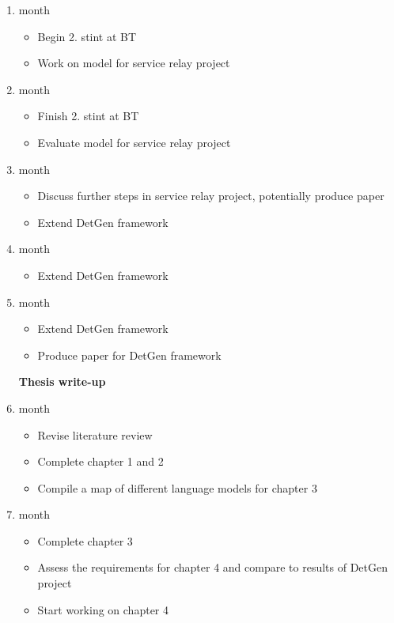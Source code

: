 \documentclass[a4paper,12pt,twoside]{article}
\begin{document}
\begin{enumerate}
\item month
\begin{itemize}
\item Begin 2. stint at BT
\item Work on model for service relay project
\end{itemize}

\item month
\begin{itemize}
\item Finish 2. stint at BT
\item Evaluate model for service relay project
\end{itemize}

\item month
\begin{itemize}
\item Discuss further steps in service relay project, potentially produce paper
\item Extend DetGen framework
\end{itemize}

\item month
\begin{itemize}
\item Extend DetGen framework
\end{itemize}

\item month
\begin{itemize}
\item Extend DetGen framework
\item Produce paper for DetGen framework
\end{itemize}


\textbf{Thesis write-up}

\item month
\begin{itemize}
\item Revise literature review
\item Complete chapter 1 and 2
\item Compile a map of different language models for chapter 3
\end{itemize}
\item month
\begin{itemize}
\item Complete chapter 3
\item Assess the requirements for chapter 4 and compare to results of DetGen project
\item Start working on chapter 4
\end{itemize}


\end{enumerate}
\end{document}
